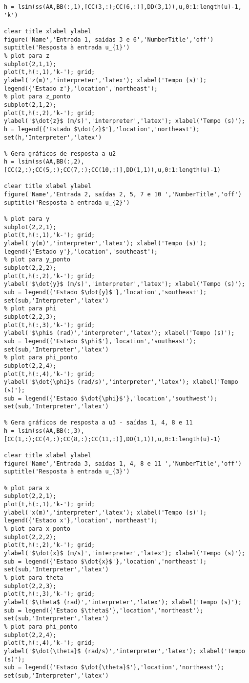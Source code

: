 \begin{lstlisting}[inputencoding=latin1]
% Gera gráficos de resposta a u1 - saídas 3 e 6
h = lsim(ss(AA,BB(:,1),[CC(3,:);CC(6,:)],DD(3,1)),u,0:1:length(u)-1, 'k')

clear title xlabel ylabel
figure('Name','Entrada 1, saídas 3 e 6','NumberTitle','off')
suptitle('Resposta à entrada u_{1}')
% plot para z
subplot(2,1,1);
plot(t,h(:,1),'k-'); grid;
ylabel('z(m)','interpreter','latex'); xlabel('Tempo (s)');
legend({'Estado z'},'location','northeast');
% plot para z_ponto
subplot(2,1,2);
plot(t,h(:,2),'k-'); grid;
ylabel('$\dot{z}$ (m/s)','interpreter','latex'); xlabel('Tempo (s)');
h = legend({'Estado $\dot{z}$'},'location','northeast');
set(h,'Interpreter','latex')

% Gera gráficos de resposta a u2
h = lsim(ss(AA,BB(:,2),[CC(2,:);CC(5,:);CC(7,:);CC(10,:)],DD(1,1)),u,0:1:length(u)-1)

clear title xlabel ylabel
figure('Name','Entrada 2, saídas 2, 5, 7 e 10 ','NumberTitle','off')
suptitle('Resposta à entrada u_{2}')

% plot para y
subplot(2,2,1);
plot(t,h(:,1),'k-'); grid;
ylabel('y(m)','interpreter','latex'); xlabel('Tempo (s)');
legend({'Estado y'},'location','southeast');
% plot para y_ponto
subplot(2,2,2);
plot(t,h(:,2),'k-'); grid;
ylabel('$\dot{y}$ (m/s)','interpreter','latex'); xlabel('Tempo (s)');
sub = legend({'Estado $\dot{y}$'},'location','southeast');
set(sub,'Interpreter','latex')
% plot para phi
subplot(2,2,3);
plot(t,h(:,3),'k-'); grid;
ylabel('$\phi$ (rad)','interpreter','latex'); xlabel('Tempo (s)');
sub = legend({'Estado $\phi$'},'location','southeast');
set(sub,'Interpreter','latex')
% plot para phi_ponto
subplot(2,2,4);
plot(t,h(:,4),'k-'); grid;
ylabel('$\dot{\phi}$ (rad/s)','interpreter','latex'); xlabel('Tempo (s)');
sub = legend({'Estado $\dot{\phi}$'},'location','southwest');
set(sub,'Interpreter','latex')

% Gera gráficos de resposta a u3 - saídas 1, 4, 8 e 11
h = lsim(ss(AA,BB(:,3),[CC(1,:);CC(4,:);CC(8,:);CC(11,:)],DD(1,1)),u,0:1:length(u)-1)

clear title xlabel ylabel
figure('Name','Entrada 3, saídas 1, 4, 8 e 11 ','NumberTitle','off')
suptitle('Resposta à entrada u_{3}')

% plot para x
subplot(2,2,1);
plot(t,h(:,1),'k-'); grid;
ylabel('x(m)','interpreter','latex'); xlabel('Tempo (s)');
legend({'Estado x'},'location','northeast');
% plot para x_ponto
subplot(2,2,2);
plot(t,h(:,2),'k-'); grid;
ylabel('$\dot{x}$ (m/s)','interpreter','latex'); xlabel('Tempo (s)');
sub = legend({'Estado $\dot{x}$'},'location','northeast');
set(sub,'Interpreter','latex')
% plot para theta
subplot(2,2,3);
plot(t,h(:,3),'k-'); grid;
ylabel('$\theta$ (rad)','interpreter','latex'); xlabel('Tempo (s)');
sub = legend({'Estado $\theta$'},'location','northeast');
set(sub,'Interpreter','latex')
% plot para phi_ponto
subplot(2,2,4);
plot(t,h(:,4),'k-'); grid;
ylabel('$\dot{\theta}$ (rad/s)','interpreter','latex'); xlabel('Tempo (s)');
sub = legend({'Estado $\dot{\theta}$'},'location','northeast');
set(sub,'Interpreter','latex')


\end{lstlisting}
